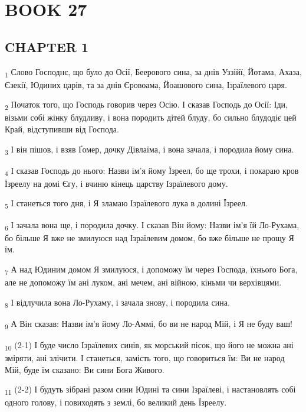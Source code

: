 \section{BOOK 27}
\subsection{CHAPTER 1}
\begin{tcolorbox}
\textsubscript{1} Слово Господнє, що було до Осії, Беерового сина, за днів Уззійї, Йотама, Ахаза, Єзекії, Юдиних царів, та за днів Єровоама, Йоашового сина, Ізраїлевого царя.
\end{tcolorbox}
\begin{tcolorbox}
\textsubscript{2} Початок того, що Господь говорив через Осію. І сказав Господь до Осії: Іди, візьми собі жінку блудливу, і вона породить дітей блуду, бо сильно блудодіє цей Край, відступивши від Господа.
\end{tcolorbox}
\begin{tcolorbox}
\textsubscript{3} І він пішов, і взяв Ґомер, дочку Дівлаїма, і вона зачала, і породила йому сина.
\end{tcolorbox}
\begin{tcolorbox}
\textsubscript{4} І сказав Господь до нього: Назви ім'я йому Їзреел, бо ще трохи, і покараю кров Їзреелу на домі Єгу, і вчиню кінець царству Ізраїлевого дому.
\end{tcolorbox}
\begin{tcolorbox}
\textsubscript{5} І станеться того дня, і Я зламаю Ізраїлевого лука в долині Їзреел.
\end{tcolorbox}
\begin{tcolorbox}
\textsubscript{6} І зачала вона ще, і породила дочку. І сказав Він йому: Назви ім'я їй Ло-Рухама, бо більше Я вже не змилуюся над Ізраїлевим домом, бо вже більше не прощу Я їм.
\end{tcolorbox}
\begin{tcolorbox}
\textsubscript{7} А над Юдиним домом Я змилуюся, і допоможу їм через Господа, їхнього Бога, але не допоможу їм ані луком, ані мечем, ані війною, кіньми чи верхівцями.
\end{tcolorbox}
\begin{tcolorbox}
\textsubscript{8} І відлучила вона Ло-Рухаму, і зачала знову, і породила сина.
\end{tcolorbox}
\begin{tcolorbox}
\textsubscript{9} А Він сказав: Назви ім'я йому Ло-Аммі, бо ви не народ Мій, і Я не буду ваш!
\end{tcolorbox}
\begin{tcolorbox}
\textsubscript{10} (2-1) І буде число Ізраїлевих синів, як морський пісок, що його не можна ані зміряти, ані злічити. І станеться, замість того, що говориться їм: Ви не народ Мій, буде їм сказано: Ви сини Бога Живого.
\end{tcolorbox}
\begin{tcolorbox}
\textsubscript{11} (2-2) І будуть зібрані разом сини Юдині та сини Ізраїлеві, і настановлять собі одного голову, і повиходять з землі, бо великий день Їзреелу.
\end{tcolorbox}
